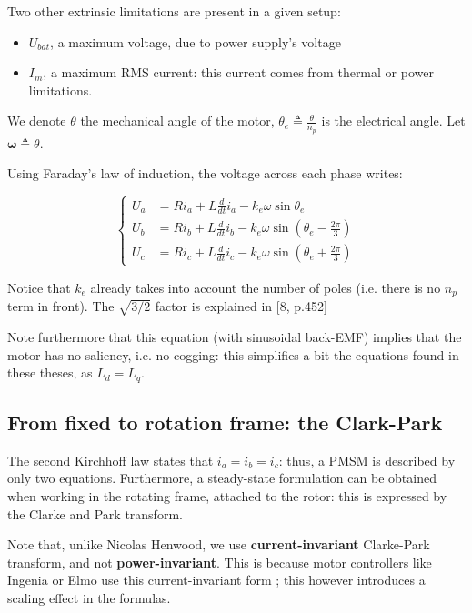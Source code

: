 \documentclass[a4paper,10pt]{article}
\begin{document}
Two other extrinsic limitations are present in a given setup:
\begin{itemize}
	\item $U_{bat}$, a maximum voltage, due to power supply's voltage
	\item $I_m$, a maximum RMS current: this current comes from thermal or power limitations.
\end{itemize}

We denote $\theta$ the mechanical angle of the motor, $\theta_e \triangleq \frac{\theta}{n_p}$ is the electrical angle. Let $\bm \omega \triangleq \dot{\theta}$.

Using Faraday's law of induction, the voltage across each phase writes:

\begin{equation}
	\left\{
	\begin{aligned}
		U_a &= R i_a + L \frac{d}{dt} i_a - k_e \omega \sin \theta_e \\
		U_b &= R i_b + L \frac{d}{dt} i_b -k_e \omega \sin (\theta_e - \frac{2 \pi}{3}) \\
		U_c &= R i_c + L \frac{d}{dt} i_c - k_e \omega \sin (\theta_e + \frac{2 \pi}{3})
	\end{aligned}
	\right.
	\label{ePhase}
\end{equation}

Notice that $k_e$ already takes into account the number of poles (i.e. there is no $n_p$ term in front). The $\sqrt{3/2}$ factor is explained in [8, p.452]

Note furthermore that this equation (with sinusoidal back-EMF) implies that the motor has no saliency, i.e. no cogging: this simplifies a bit the equations found in these theses, as $L_d = L_q$.

\subsection{From fixed to rotation frame: the Clark-Park}

The second Kirchhoff law states that $i_a = i_b = i_c$: thus, a PMSM is described by only two equations. Furthermore, a steady-state formulation can be obtained when working in the rotating frame, attached to the rotor: this is expressed by the Clarke and Park transform.

Note that, unlike Nicolas Henwood, we use \textbf{current-invariant} Clarke-Park transform, and not \textbf{power-invariant}. This is because motor controllers like Ingenia or Elmo use this current-invariant form ; this however introduces a scaling effect in the formulas.
\end{document}

